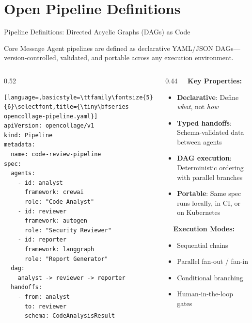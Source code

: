 \section{Open Pipeline Definitions}

\begin{frame}[fragile]{\fontsize{10}{12}\selectfont Pipeline Definitions: Directed Acyclic Graphs (DAGs) as Code}
  \begin{block}{Core Message}
    \fontsize{6}{7}\selectfont
    Agent pipelines are defined as declarative YAML/JSON DAGs---version-controlled,
    validated, and portable across any execution environment.
  \end{block}

  \vspace{0.0cm}

  \begin{columns}[T]
    \begin{column}{0.52\textwidth}
      \begin{lstlisting}[language=,basicstyle=\ttfamily\fontsize{5}{6}\selectfont,title={\tiny\bfseries opencollage-pipeline.yaml}]
apiVersion: opencollage/v1
kind: Pipeline
metadata:
  name: code-review-pipeline
spec:
  agents:
    - id: analyst
      framework: crewai
      role: "Code Analyst"
    - id: reviewer
      framework: autogen
      role: "Security Reviewer"
    - id: reporter
      framework: langgraph
      role: "Report Generator"
  dag:
    analyst -> reviewer -> reporter
  handoffs:
    - from: analyst
      to: reviewer
      schema: CodeAnalysisResult
      \end{lstlisting}
    \end{column}
    \begin{column}{0.44\textwidth}
      \fontsize{6}{7}\selectfont
      \textbf{\ \ Key Properties:}
      \begin{itemize}
        \item \textbf{Declarative}: Define \emph{what}, not \emph{how}
        \item \textbf{Typed handoffs}: Schema-validated data between agents
        \item \textbf{DAG execution}: Deterministic ordering with parallel branches
        \item \textbf{Portable}: Same spec runs locally, in CI, or on Kubernetes
      \end{itemize}

      \vspace{0.1cm}

      \textbf{\ \ Execution Modes:}
      \begin{itemize}
        \item Sequential chains
        \item Parallel fan-out / fan-in
        \item Conditional branching
        \item Human-in-the-loop gates
      \end{itemize}
    \end{column}
  \end{columns}
\end{frame}
